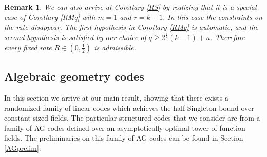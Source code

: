 \documentclass[draft, onecolumn, 11pt]{IEEEtran}
\newtheorem{remark}[theorem]{Remark}
\begin{document}
\begin{remark}
    We can also arrive at Corollary \ref{RS} by realizing that it is a special case of Corollary \ref{RMq} with $m = 1$ and $r = k-1$. In this case the constraints on the rate disappear. The first hypothesis in Corollary \ref{RMq} is automatic, and the second hypothesis is satisfied by our choice of $q \geq 2^{\frac{4}{\varepsilon}}(k-1) + n$. Therefore every fixed rate $R \in \left(0, \frac{1}{2}\right)$ is admissible. 
\end{remark}
\subsection{Algebraic geometry codes}
In this section we arrive at our main result, showing that there exists a randomized family of linear codes which achieves the half-Singleton bound over constant-sized fields. The particular structured codes that we consider are from a family of AG codes defined over an asymptotically optimal tower of function fields. The preliminaries on this family of AG codes can be found in Section \ref{AGprelim}.
\end{document}
